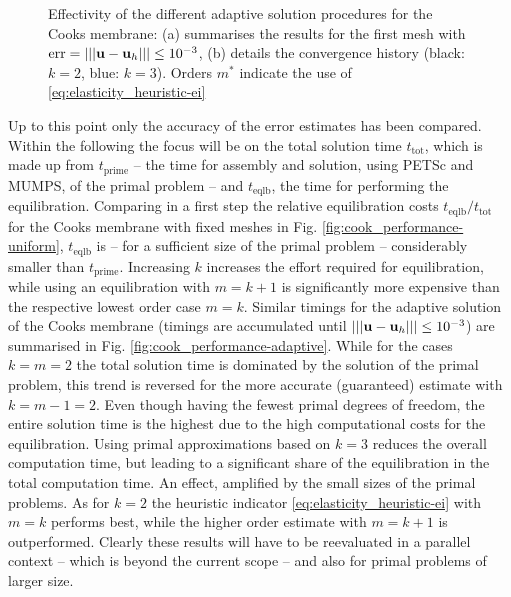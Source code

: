 \begin{figure}
\begin{subfigure}[b]{0.58\textwidth}
        \caption{}
        \label{fig:cook_results-convhist}
    \end{subfigure}
    \caption{Effectivity of the different adaptive solution procedures for the Cooks membrane: (a) summarises the results for the first mesh with $\mathrm{err} = \vert\vert\vert \bm{\mathrm{u}} - \bm{\mathrm{u}}_h \vert\vert\vert \leq 10^{-3}$, (b) details the convergence history (black: $k=2$, blue: $k=3$). Orders $m^*$ indicate the use of \eqref{eq:elasticity_heuristic-ei}}
    \label{fig:linelast-cook_results}
\end{figure}

Up to this point only the accuracy of the error estimates has been compared. 
Within the following the focus will be on the total solution time $t_\mathrm{tot}$, which is made up from $t_\mathrm{prime}$ -- the time for assembly and solution, using PETSc and MUMPS, of the primal problem -- and $t_\mathrm{eqlb}$, the time for performing the equilibration.
Comparing in a first step the relative equilibration costs $t_\mathrm{eqlb}/t_\mathrm{tot}$ for the Cooks membrane with fixed meshes in Fig. \ref{fig:cook_performance-uniform}, $t_\mathrm{eqlb}$ is -- for a sufficient size of the primal problem -- considerably smaller than $t_\mathrm{prime}$.  
Increasing $k$ increases the effort required for equilibration, while using an equilibration with $m=k+1$ is significantly more expensive than the respective lowest order case $m=k$. Similar timings for the adaptive solution of the Cooks membrane (timings are accumulated until $\vert\vert\vert \bm{\mathrm{u}} - \bm{\mathrm{u}}_h \vert\vert\vert \leq 10^{-3}$) are summarised in Fig. \ref{fig:cook_performance-adaptive}.
While for the cases $k=m=2$ the total solution time is dominated by the solution of the primal problem, this trend is reversed for the more accurate (guaranteed) estimate with $k=m-1=2$.
Even though having the fewest primal degrees of freedom, the entire solution time is the highest due to the high computational costs for the equilibration.
Using primal approximations based on $k=3$ reduces the overall computation time, but leading to a significant share of the equilibration in the total computation time. 
An effect, amplified by the small sizes of the primal problems.
As for $k=2$ the heuristic indicator \eqref{eq:elasticity_heuristic-ei} with $m=k$ performs best, while the higher order estimate with $m=k+1$ is outperformed.
Clearly these results will have to be reevaluated in a parallel context -- which is beyond the current scope -- and also for primal problems of larger size.
